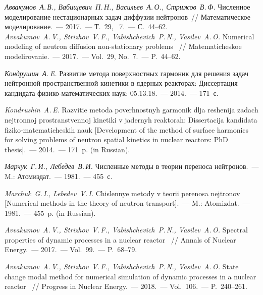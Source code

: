 \documentclass{crm-article}
\begin{document}
\begin{thebibliography}

 {\it Аввакумов~А.\,В., Вабищевич~П.\,Н., Васильев~А.\,О., Стрижов~В.\,Ф.} 
Численное моделирование нестационарных задач диффузии нейтронов~// Математическое моделирование.~--- 2017.~--- Т.~29, \No~7.~--- С.~44--62.
\\
{\footnotesize{\it Avvakumov~A.\,V., Strizhov~V.\,F., Vabishchevich~P.\,N., Vasilev~A.\,O.}
Numerical modeling of neutron diffusion non-stationary problems ~// Matematicheskoe modelirovanie.~--- 2017.~--- Vol.~29, No.~7.~--- P.~44--62.}

 {\it Кондрушин~А.\,E.} 
Развитие метода поверхностных гармоник для решения задач нейтронной пространственной кинетики в ядерных реакторах: Диссертация кандидата физико-математических наук: 05.13.18.~--- 2014.~--- 171~с.
\\
{\footnotesize{\it Kondrushin~A.\,E.}
Razvitie metoda poverhnostnyh garmonik dlja reshenija zadach nejtronnoj prostranstvennoj kinetiki v jadernyh reaktorah: Dissertacija kandidata fiziko-matematicheskih nauk [Development of the method of surface harmonics for solving problems of neutron spatial kinetics in nuclear reactors: PhD thesis].~--- 2014.~--- 171~p. (in Russian).\par}

 {\it Марчук~Г.\,И., Лебедев~В.\,И.} 
Численные методы в теории переноса нейтронов.~--- M.: Атомиздат.~--- 1981.~--- 455~с.
\\
{\footnotesize{\it Marchuk~G.\,I., Lebedev~V.\,I.}
Chislennye metody v teorii perenosa nejtronov [Numerical methods in the theory of neutron transport].~--- M.: Atomizdat.~--- 1981.~--- 455~p. (in Russian).\par}
    
 {\it Avvakumov~A.\,V., Strizhov~V.\,F., Vabishchevich~P.\,N., Vasilev~A.\,O.} Spectral properties of dynamic processes in a nuclear reactor ~// Annals of Nuclear Energy.~--- 2017.~--- Vol.~99.~--- P.~68--79.

 {\it Avvakumov~A.\,V., Strizhov~V.\,F., Vabishchevich~P.\,N., Vasilev~A.\,O.} State change modal method for numerical simulation of dynamic processes in a nuclear reactor ~// Progress in Nuclear Energy.~--- 2018.~--- Vol.~106.~--- P.~240--261.


\end{thebibliography}
\end{document}
